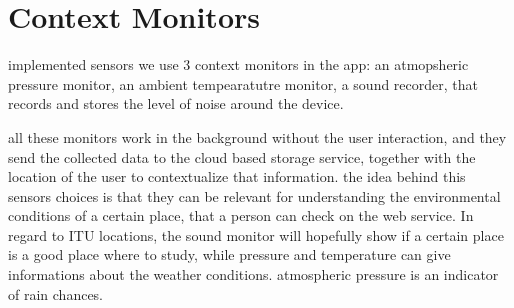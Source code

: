 \section{Context Monitors}




implemented sensors
we use 3 context monitors in the app:
	an atmopsheric pressure monitor,
	an ambient tempearatutre monitor,
	a sound recorder, that records and stores the level of noise around the device.

all these monitors work in the background without the user interaction,
and they send the collected data to the cloud based storage service, together with the location of the user to contextualize that information.
the idea behind this sensors choices is that they can be relevant for understanding the environmental conditions of a certain place, that a person can check on the web service.
In regard to ITU locations, the sound monitor will hopefully show if a certain place is a good place where to study, while pressure and temperature can give informations about the weather conditions. atmospheric pressure is an indicator of rain chances.